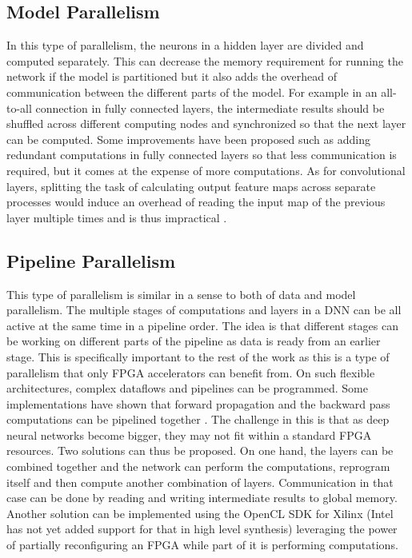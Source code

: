 \subsection{Model Parallelism}
In this type of parallelism, the neurons in a hidden layer are divided and computed separately. This can decrease the memory requirement for running the network if the model is partitioned but it also adds the overhead of communication between the different parts of the model. For example in an all-to-all connection in fully connected layers, the intermediate results should be shuffled across different computing nodes and synchronized so that the next layer can be computed. Some improvements have been proposed such as adding redundant computations in fully connected layers so that less communication is required\cite{muller1994neural},  but it comes at the expense of more computations. As for convolutional layers, splitting the task of calculating output feature maps across separate processes would induce an overhead of reading the input map of the previous layer multiple times and is thus impractical \cite{deepfpga}.

\subsection{Pipeline Parallelism}
This type of parallelism is similar in a sense to both of data and model parallelism. The multiple stages of computations and layers in a DNN can be all active at the same time in a pipeline order. The idea is that different stages can be working on different parts of the pipeline as data is ready from an earlier stage. This is specifically important to the rest of the work as this is a type of parallelism that only FPGA accelerators can benefit from. On such flexible architectures, complex dataflows and pipelines can be programmed. Some implementations have shown that forward propagation and the backward pass computations can be pipelined together \cite{abadi2016tensorflow, collobert2011torch7}. The challenge in this is that as deep neural networks become bigger, they may not fit within a standard FPGA resources. Two solutions can thus be proposed. On one hand, the layers can be combined together and the network can perform the computations, reprogram itself and then compute another combination of layers. Communication in that case can be done by reading and writing intermediate results to global memory. Another solution can be implemented using the OpenCL SDK for Xilinx (Intel has not yet added support for that in high level synthesis) leveraging the power of partially reconfiguring an FPGA while part of it is performing computations.
